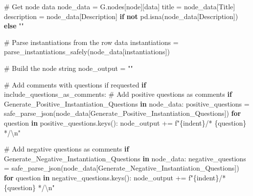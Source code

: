 \documentclass[
  11pt,
  letterpaper,
]{book}
\newenvironment{Shaded}{\begin{snugshade}}{\end{snugshade}}
\newcommand{\CharTok}[1]{\textcolor[rgb]{0.13,0.47,0.30}{#1}}
\newcommand{\CommentTok}[1]{\textcolor[rgb]{0.37,0.37,0.37}{#1}}
\newcommand{\ControlFlowTok}[1]{\textcolor[rgb]{0.00,0.23,0.31}{\textbf{#1}}}
\newcommand{\KeywordTok}[1]{\textcolor[rgb]{0.00,0.23,0.31}{\textbf{#1}}}
\newcommand{\NormalTok}[1]{\textcolor[rgb]{0.00,0.23,0.31}{#1}}
\newcommand{\OperatorTok}[1]{\textcolor[rgb]{0.37,0.37,0.37}{#1}}
\newcommand{\SpecialCharTok}[1]{\textcolor[rgb]{0.37,0.37,0.37}{#1}}
\newcommand{\SpecialStringTok}[1]{\textcolor[rgb]{0.13,0.47,0.30}{#1}}
\newcommand{\StringTok}[1]{\textcolor[rgb]{0.13,0.47,0.30}{#1}}
\begin{document}
\begin{Shaded}
\begin{Highlighting}[]
      \CommentTok{\# Get node data}
\NormalTok{      node\_data }\OperatorTok{=}\NormalTok{ G.nodes[node][}\StringTok{\textquotesingle{}data\textquotesingle{}}\NormalTok{]}
\NormalTok{      title }\OperatorTok{=}\NormalTok{ node\_data[}\StringTok{\textquotesingle{}Title\textquotesingle{}}\NormalTok{]}
\NormalTok{      description }\OperatorTok{=}\NormalTok{ node\_data[}\StringTok{\textquotesingle{}Description\textquotesingle{}}\NormalTok{] }\ControlFlowTok{if} \KeywordTok{not}\NormalTok{ pd.isna(node\_data[}\StringTok{\textquotesingle{}Description\textquotesingle{}}\NormalTok{]) }\ControlFlowTok{else} \StringTok{""}

      \CommentTok{\# Parse instantiations from the row data}
\NormalTok{      instantiations }\OperatorTok{=}\NormalTok{ parse\_instantiations\_safely(node\_data[}\StringTok{\textquotesingle{}instantiations\textquotesingle{}}\NormalTok{])}

      \CommentTok{\# Build the node string}
\NormalTok{      node\_output }\OperatorTok{=} \StringTok{""}

      \CommentTok{\# Add comments with questions if requested}
      \ControlFlowTok{if}\NormalTok{ include\_questions\_as\_comments:}
          \CommentTok{\# Add positive questions as comments}
          \ControlFlowTok{if} \StringTok{\textquotesingle{}Generate\_Positive\_Instantiation\_Questions\textquotesingle{}} \KeywordTok{in}\NormalTok{ node\_data:}
\NormalTok{              positive\_questions }\OperatorTok{=}\NormalTok{ safe\_parse\_json(node\_data[}\StringTok{\textquotesingle{}Generate\_Positive\_Instantiation\_Questions\textquotesingle{}}\NormalTok{])}
              \ControlFlowTok{for}\NormalTok{ question }\KeywordTok{in}\NormalTok{ positive\_questions.keys():}
\NormalTok{                  node\_output }\OperatorTok{+=} \SpecialStringTok{f"}\SpecialCharTok{\{}\NormalTok{indent}\SpecialCharTok{\}}\SpecialStringTok{/* }\SpecialCharTok{\{}\NormalTok{question}\SpecialCharTok{\}}\SpecialStringTok{ */}\CharTok{\textbackslash{}n}\SpecialStringTok{"}

          \CommentTok{\# Add negative questions as comments}
          \ControlFlowTok{if} \StringTok{\textquotesingle{}Generate\_Negative\_Instantiation\_Questions\textquotesingle{}} \KeywordTok{in}\NormalTok{ node\_data:}
\NormalTok{              negative\_questions }\OperatorTok{=}\NormalTok{ safe\_parse\_json(node\_data[}\StringTok{\textquotesingle{}Generate\_Negative\_Instantiation\_Questions\textquotesingle{}}\NormalTok{])}
              \ControlFlowTok{for}\NormalTok{ question }\KeywordTok{in}\NormalTok{ negative\_questions.keys():}
\NormalTok{                  node\_output }\OperatorTok{+=} \SpecialStringTok{f"}\SpecialCharTok{\{}\NormalTok{indent}\SpecialCharTok{\}}\SpecialStringTok{/* }\SpecialCharTok{\{}\NormalTok{question}\SpecialCharTok{\}}\SpecialStringTok{ */}\CharTok{\textbackslash{}n}\SpecialStringTok{"}


\end{Highlighting}
\end{Shaded}
\end{document}
